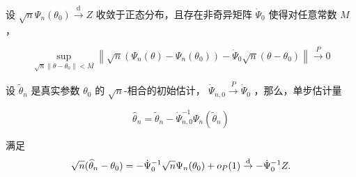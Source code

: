 \begin{theorem}[单步 Z-估计的渐近性质]\label{thm:ch9:one-step-z-estimator}

设 $\sqrt{n}\Psi_n(\theta_0) \overset{\mathrm{d}}{\to} Z$ 收敛于正态分布，且存在非奇异矩阵 $\dot{\Psi}_0$ 使得对任意常数 $M$，

\begin{equation}
\label{eq:ch9:tag-12}
\sup_{\sqrt{n}\|\theta - \theta_0\| < M} \left\| \sqrt{n}(\Psi_n(\theta) - \Psi_n(\theta_0)) - \dot{\Psi}_0 \sqrt{n}(\theta - \theta_0) \right\| \overset{P}{\to} 0
\end{equation}

设 $\widetilde{\theta}_n$ 是真实参数 $\theta_0$ 的 $\sqrt{n}$-相合的初始估计， $\dot{\Psi}_{n,0}\overset{P}{\to}\dot{\Psi}_0$ ，那么，单步估计量

\begin{equation}
\label{eq:ch9:tag-13}
\widehat{\theta}_n = \widetilde{\theta}_n - \dot{\Psi}_{n,0}^{-1} \Psi_n(\widetilde{\theta}_n)
\end{equation}

满足
\[
\sqrt{n}(\widehat{\theta}_n - \theta_0) = -\dot{\Psi}_0^{-1} \sqrt{n}\Psi_n(\theta_0) + o_P(1)\overset{\rm d}\to -\dot\Psi_0^{-1}Z.
\]

\end{theorem}

